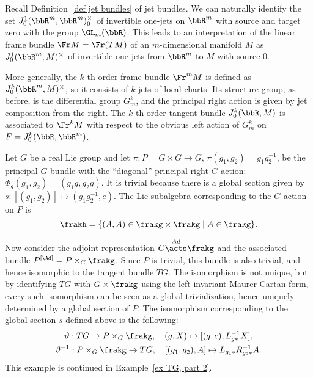 \begin{example}
    Recall Definition~\ref{def jet bundles} of jet bundles. We can naturally identify the set $J^1_0(\bbR^m,\bbR^m)_0^\times$ of invertible one-jets on $\bbR^m$ with source and target zero with the group $\GL_m(\bbR)$. This leads to an interpretation of the linear frame bundle $\Fr M=\Fr(TM)$ of an $m$-dimensional manifold $M$ as $J^1_0(\bbR^m,M)^\times$ of invertible one-jets from $\bbR^m$ to $M$ with source $0$.

    More generally, the $k$-th order frame bundle $\Fr^mM$ is defined as $J^k_0(\bbR^m,M)^\times$, so it consists of $k$-jets of local charts. Its structure group, as before, is the differential group $G^k_m$, and the principal right action is given by jet composition from the right. The $k$-th order tangent bundle $J^k_0(\bbR,M)$ is associated to $\Fr^k M$ with respect to the obvious left action of $G^k_m$ on $F=J^k_0(\bbR,\bbR^m)$.
\end{example}


\begin{example}\label{ex TG, part 1}
    Let $G$ be a real Lie group and let $\pi:P=G\times G\to G$, $\pi(g_1,g_2)=g_1g_2^{-1}$, be the principal $G$-bundle with the ``diagonal'' principal right $G$-action: $\Phi_g(g_1,g_2)=(g_1g,g_2g)$.  It is trivial because there is a global section given by $s:[(g_1,g_2)]\mapsto (g_1g_2^{-1},e)$. The Lie subalgebra corresponding to the $G$-action on $P$ is 
    \[\frakh=\{(A,A)\in \frakg\times\frakg\mid A\in\frakg\}.\]

    Now consider the adjoint representation $G\overset{Ad}{\acts}\frakg$ and the associated bundle $P^{[\Ad]}=P\times_G \frakg$. Since $P$ is trivial, this bundle is also trivial, and hence isomorphic to the tangent bundle $TG$. The isomorphism is not unique, but by identifying $TG$ with $G\times\frakg$ using the left-invariant Maurer-Cartan form, every such isomorphism can be seen as a global trivialization, hence uniquely determined by a global section of $P$. The isomorphism corresponding to the global section $s$ defined above is the following:
    \begin{gather}
    	\vartheta: TG\to P \times_G \frakg,\quad (g,X)\mapsto [(g,e),L_{g\ast}^{-1}X],\\
    	\vartheta^{-1}: P\times_G \frakg\to TG,\quad [(g_1,g_2),A]\mapsto L_{g_1\ast}R_{g_2\ast}^{-1}  A.
    \end{gather}
    This example is continued in Example~\ref{ex TG, part 2}.
\end{example}


